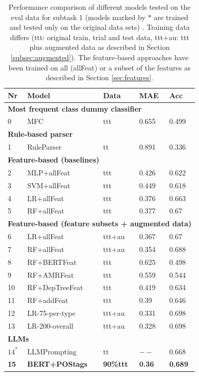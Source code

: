 \documentclass[11pt]{article}
\begin{document}
\begin{table}[ht]
\small
\begin{tabular}{|l|l|l|l|l|}

\hline
\textbf{Nr} & \textbf{Model} & \textbf{Data} & \textbf{MAE} & \textbf{Acc} \\
\hline
\multicolumn{5}{|l|}{\textbf{Most frequent class dummy classifier}}\\
\hline
0 & MFC & ttt & 0.655 & 0.499 \\
\hline
\multicolumn{5}{|l|}{\textbf{Rule-based parser}}\\
\hline
1 & RuleParser & tt & 0.891 & 0.336\\
\hline
\multicolumn{5}{|l|}{\textbf{Feature-based (baselines)}}\\
\hline
2 & MLP+allFeat & ttt & 0.426 & 0.622 \\
3 & SVM+allFeat & ttt & 0.449 & 0.618 \\
4 & LR+allFeat & ttt & 0.376 & 0.663 \\
5 & RF+allFeat & ttt & 0.377 & 0.67 \\
\hline
\multicolumn{5}{|l|}{\textbf{Feature-based (feature subsets + augmented data)}}\\
\hline
6 & LR+allFeat & ttt+au & 0.367 & 0.67\\
7 & RF+allFeat & ttt+au & 0.354 &
0.688 \\
8 & RF+BERTFeat & ttt & 0.625 & 0.498 \\
9 & RF+AMRFeat & ttt & 0.559 & 0.544 \\
10 & RF+DepTreeFeat & ttt & 0.419 & 0.634 \\
11 & RF+addFeat & ttt & 0.39 & 0.646 \\
12 & LR-75-per-type & ttt+au & 0.331 & 0.698 \\
13 & LR-200-overall & ttt+au & 0.328 & 0.698
\\
\hline
\multicolumn{5}{|l|}{\textbf{LLMs}} \\
\hline
$14^\ast$ & LLMPrompting & tt & $--$ & 0.668\\
\textbf{15} & \textbf{BERT+POStags} & \textbf{90\%ttt} & \textbf{0.36} & \textbf{0.689} \\
\hline
\end{tabular}
\caption{Performance comparison of different models tested on the eval data for subtask 1 (models marked by $\ast$ are trained and tested only on the original data sets)%
. Training data differs (ttt: original train, trial and test data, ttt+au: ttt plus augmented data as described in Section \ref{subsec:augmented}). The feature-based approaches have been trained on all (allFeat)
or a subset of the features as described in Section \ref{sec:features}.}
\label{tab:classifier_results}
\end{table}
\end{document}

